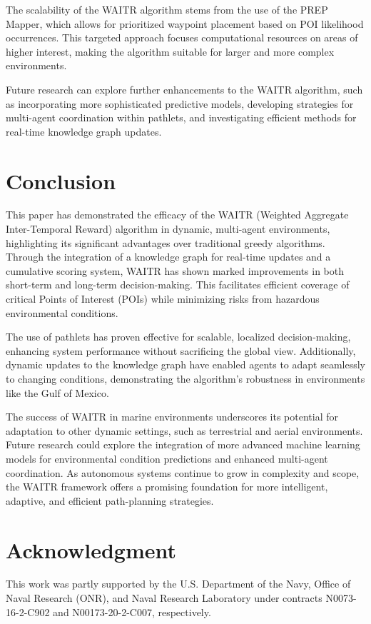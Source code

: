 \documentclass[conference]{IEEEtran}
\begin{document}
The scalability of the WAITR algorithm stems from the use of the PREP Mapper, which allows for prioritized waypoint placement based on POI likelihood occurrences. This targeted approach focuses computational resources on areas of higher interest, making the algorithm suitable for larger and more complex environments.

Future research can explore further enhancements to the WAITR algorithm, such as incorporating more sophisticated predictive models, developing strategies for multi-agent coordination within pathlets, and investigating efficient methods for real-time knowledge graph updates.


\section{Conclusion}
This paper has demonstrated the efficacy of the WAITR (Weighted Aggregate Inter-Temporal Reward) algorithm in dynamic, multi-agent environments, highlighting its significant advantages over traditional greedy algorithms. Through the integration of a knowledge graph for real-time updates and a cumulative scoring system, WAITR has shown marked improvements in both short-term and long-term decision-making. This facilitates efficient coverage of critical Points of Interest (POIs) while minimizing risks from hazardous environmental conditions.

The use of pathlets has proven effective for scalable, localized decision-making, enhancing system performance without sacrificing the global view. Additionally, dynamic updates to the knowledge graph have enabled agents to adapt seamlessly to changing conditions, demonstrating the algorithm’s robustness in environments like the Gulf of Mexico.

The success of WAITR in marine environments underscores its potential for adaptation to other dynamic settings, such as terrestrial and aerial environments. Future research could explore the integration of more advanced machine learning models for environmental condition predictions and enhanced multi-agent coordination. As autonomous systems continue to grow in complexity and scope, the WAITR framework offers a promising foundation for more intelligent, adaptive, and efficient path-planning strategies.



\section*{Acknowledgment}
This work was partly supported by the U.S. Department
of the Navy, Office of Naval Research (ONR), and Naval Research Laboratory under contracts N0073-16-2-C902 and N00173-20-2-C007, respectively.




\end{document}
